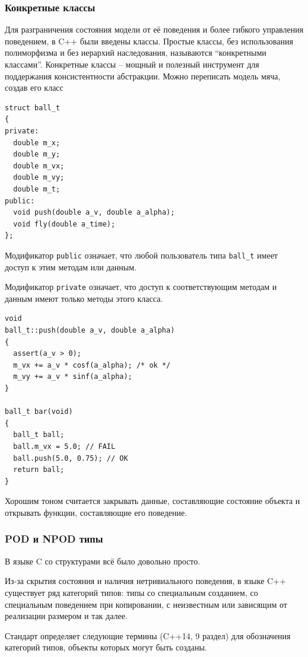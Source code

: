 \documentclass[a4paper,12pt,oneside]{article}
\begin{document}
\subsubsection{Конкретные классы}\label{ConcreteClasses}

Для разграничения состояния модели от её поведения и более гибкого управления поведением, в C++ были введены классы. Простые классы, без использования полиморфизма и без иерархий наследования, называются ``конкретными классами''. Конкретные классы -- мощный и полезный инструмент для поддержания консистентности абстракции. Можно переписать модель мяча, создав его класс

\begin{lstlisting}
struct ball_t
{
private:
  double m_x;
  double m_y;
  double m_vx;
  double m_vy;
  double m_t;
public:
  void push(double a_v, double a_alpha);
  void fly(double a_time);
};
\end{lstlisting}

Модификатор \lstinline!public! означает, что любой пользователь типа \lstinline!ball_t! имеет доступ к этим методам или данным. 

Модификатор \lstinline!private! означает, что доступ к соответствующим методам и данным имеют только методы этого класса.

\begin{lstlisting}
void
ball_t::push(double a_v, double a_alpha)
{
  assert(a_v > 0);
  m_vx += a_v * cosf(a_alpha); /* ok */
  m_vy += a_v * sinf(a_alpha);
}

ball_t bar(void)
{
  ball_t ball;
  ball.m_vx = 5.0; // FAIL
  ball.push(5.0, 0.75); // OK
  return ball;
}
\end{lstlisting}

Хорошим тоном считается закрывать данные, составляющие состояние объекта и открывать функции, составляющие его поведение.

\subsubsection{POD и NPOD типы}\label{PodNpod}

В языке C со структурами всё было довольно просто.

Из-за скрытия состояния и наличия нетривиального поведения, в языке C++ существует ряд категорий типов: типы со специальным созданием, со специальным поведением при копировании, с неизвестным или зависящим от реализации размером и так далее.

Стандарт определяет следующие термины (C++14, 9 раздел) для обозначения категорий типов, объекты которых могут быть созданы.
\end{document}
